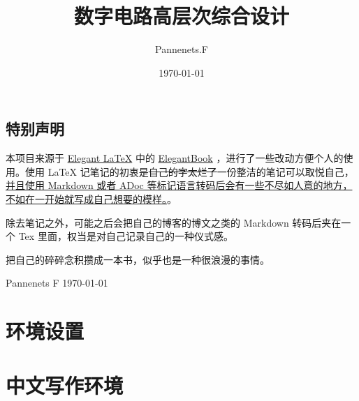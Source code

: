 \documentclass[cn,11pt,chinese,black,simple]{elegantbook}
\title{数字电路高层次综合设计}
\author{Pannenets.F}
\date{\today}
\begin{document}
\maketitle
\frontmatter

\chapter*{特别声明}

本项目来源于 \href{https://github.com/ElegantLaTeX}{Elegant \LaTeX{}} 中的 \href{https://github.com/ElegantLaTeX/ElegantBook}{ElegantBook} ，进行了一些改动方便个人的使用。使用 \LaTeX{} 记笔记的初衷是\sout{自己的字太烂了}一份整洁的笔记可以取悦自己，\underline{并且使用 Markdown 或者 ADoc 等标记语言转码后会有一些不尽如人意的地方，不如在一开始就写成自己想要的模样。}。

除去笔记之外，可能之后会把自己的博客的博文之类的 Markdown 转码后夹在一个 Tex 里面，权当是对自己记录自己的一种仪式感。

\begin{center}
  把自己的碎碎念积攒成一本书，似乎也是一种很浪漫的事情。
\end{center}

\vskip 1.5cm


\begin{flushright}
Pannenets F
\today
\end{flushright}

\tableofcontents

\mainmatter

\part{环境设置}






\part{中文写作环境}




\end{document}
